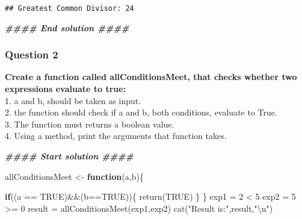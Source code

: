 \documentclass[
]{article}
\newenvironment{Shaded}{\begin{snugshade}}{\end{snugshade}}
\newcommand{\ConstantTok}[1]{\textcolor[rgb]{0.00,0.00,0.00}{#1}}
\newcommand{\ControlFlowTok}[1]{\textcolor[rgb]{0.13,0.29,0.53}{\textbf{#1}}}
\newcommand{\DecValTok}[1]{\textcolor[rgb]{0.00,0.00,0.81}{#1}}
\newcommand{\DocumentationTok}[1]{\textcolor[rgb]{0.56,0.35,0.01}{\textbf{\textit{#1}}}}
\newcommand{\FunctionTok}[1]{\textcolor[rgb]{0.00,0.00,0.00}{#1}}
\newcommand{\NormalTok}[1]{#1}
\newcommand{\OtherTok}[1]{\textcolor[rgb]{0.56,0.35,0.01}{#1}}
\newcommand{\SpecialCharTok}[1]{\textcolor[rgb]{0.00,0.00,0.00}{#1}}
\newcommand{\StringTok}[1]{\textcolor[rgb]{0.31,0.60,0.02}{#1}}
\begin{document}
\begin{verbatim}
## Greatest Common Divisor: 24
\end{verbatim}

\begin{Shaded}
\begin{Highlighting}[]
\DocumentationTok{\#\#\#\# End solution \#\#\#\#}
\end{Highlighting}
\end{Shaded}

\hypertarget{question-2-2}{%
\subsubsection{Question 2}\label{question-2-2}}

\textbf{Create a function called allConditionsMeet, that checks whether
two expressions evaluate to true:}\\
1. a and b, should be taken as input.\\
2. the function should check if a and b, both conditions, evaluate to
True.\\
3. The function must returns a boolean value.\\
4. Using a method, print the arguments that function takes.

\begin{Shaded}
\begin{Highlighting}[]
\DocumentationTok{\#\#\#\# Start solution \#\#\#\#}
\end{Highlighting}
\end{Shaded}

\begin{Shaded}
\begin{Highlighting}[]
\NormalTok{allConditionsMeet }\OtherTok{\textless{}{-}} \ControlFlowTok{function}\NormalTok{(a,b)\{}

     \ControlFlowTok{if}\NormalTok{((a }\SpecialCharTok{==} \ConstantTok{TRUE}\NormalTok{)}\SpecialCharTok{\&\&}\NormalTok{(b}\SpecialCharTok{==}\ConstantTok{TRUE}\NormalTok{))\{}
          \FunctionTok{return}\NormalTok{(}\ConstantTok{TRUE}\NormalTok{)}
\NormalTok{     \}}
\NormalTok{\}}
\NormalTok{exp1 }\OtherTok{=} \DecValTok{2} \SpecialCharTok{\textless{}} \DecValTok{5}
\NormalTok{exp2 }\OtherTok{=} \DecValTok{5} \SpecialCharTok{\textgreater{}=} \DecValTok{0}
\NormalTok{result }\OtherTok{=} \FunctionTok{allConditionsMeet}\NormalTok{(exp1,exp2)}
\FunctionTok{cat}\NormalTok{(}\StringTok{"Result is:"}\NormalTok{,result,}\StringTok{"}\SpecialCharTok{\textbackslash{}n}\StringTok{"}\NormalTok{)}
\end{Highlighting}
\end{Shaded}
\end{document}
